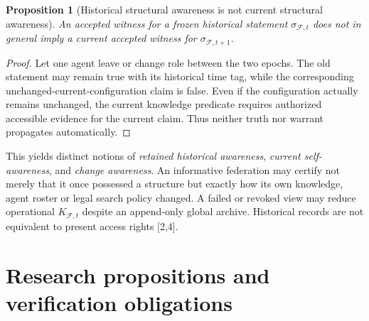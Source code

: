 \documentclass[10pt,letterpaper]{article}
\newtheorem{proposition}[definition]{Proposition}
\theoremstyle{remark}\newtheorem{remark}[definition]{Remark}
\newcommand{\F}{\mathcal{F}}
\begin{document}
\begin{proposition}[Historical structural awareness is not current structural awareness]
An accepted witness for a frozen historical statement $\sigma_{\F,t}$ does not in general imply a current accepted witness for $\sigma_{\F,t+1}$.
\end{proposition}
\begin{proof}
Let one agent leave or change role between the two epochs. The old statement may remain true with its historical time tag, while the corresponding unchanged-current-configuration claim is false. Even if the configuration actually remains unchanged, the current knowledge predicate requires authorized accessible evidence for the current claim. Thus neither truth nor warrant propagates automatically.
\end{proof}

This yields distinct notions of \emph{retained historical awareness}, \emph{current self-awareness}, and \emph{change awareness}. An informative federation may certify not merely that it once possessed a structure but exactly how its own knowledge, agent roster or legal search policy changed. A failed or revoked view may reduce operational $K_{\F,t}$ despite an append-only global archive. Historical records are not equivalent to present access rights [2,4].

\section{Research propositions and verification obligations}
\end{document}
